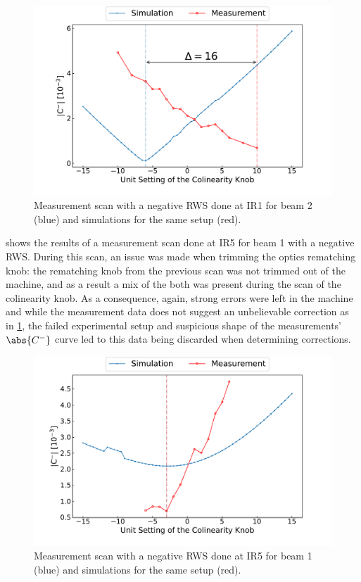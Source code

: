 \begin{figure}[!htb]
    \centering
    \includegraphics*[width=\textwidth]{Figures/IR_Coupling_Correction/rws_measurement_ir1_b2_neg.pdf}
    \caption{Measurement scan with a negative RWS done at IR\num{1} for beam \num{2} (\textcolor{mplblue}{blue}) and simulations for the same setup (\textcolor{mplr}{red}).}
    \label{figure:ir1_b2_neg_measurement}
\end{figure}

 shows the results of a measurement scan done at IR\num{5} for beam \num{1} with a negative RWS.
During this scan, an issue was made when trimming the optics rematching knob: the rematching knob from the previous scan was not trimmed out of the machine, and as a result a mix of the both was present during the scan of the colinearity knob.
As a consequence, again, strong errors were left in the machine and while the measurement data does not suggest an unbelievable correction as in \cref{figure:ir1_b2_neg_measurement}, the failed experimental setup and suspicious shape of the measurements' \(\abs{C^{-}}\) curve led to this data being discarded when determining corrections.

\begin{figure}[!htb]
    \centering
    \includegraphics*[width=\textwidth]{Figures/IR_Coupling_Correction/rws_measurement_ir5_b1_neg.pdf}
    \caption{Measurement scan with a negative RWS done at IR\num{5} for beam \num{1} (\textcolor{mplblue}{blue}) and simulations for the same setup (\textcolor{mplr}{red}).}
    \label{figure:ir5_b1_neg_measurement}
\end{figure}

